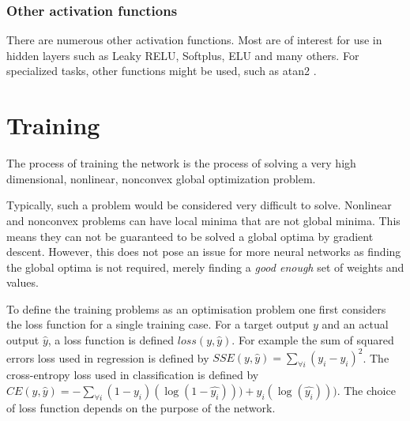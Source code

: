 \documentclass[12pt,parskip]{komatufte}
\begin{document}
\subsubsection{Other activation functions}

There are numerous other activation functions.
Most are of interest for use in hidden layers such as Leaky RELU, Softplus, ELU and many others.
For specialized tasks, other functions might be used, such as atan2 .




\section{Training}
The process of training the network is the process of solving a very high dimensional, nonlinear, nonconvex global optimization problem.


Typically, such a problem would be considered very difficult to solve.
Nonlinear and nonconvex problems can have local minima that are not global minima.
This means they can not be guaranteed to be solved  a global optima by gradient descent.
However, this does not pose an issue for more neural networks as finding the global optima is not required, merely finding a \emph{good enough} set of weights and values.

To define the training problems as an optimisation problem one first considers the loss function for a single training case.
For a target output $y$ and an actual output $\hat{y}$, a loss function is defined $loss(y, \hat{y})$.
For example the sum of squared errors loss used in regression is defined by 
$SSE(y, \hat{y})=\sum_{\forall i} (y_i-\hat{y_i})^2$.
The cross-entropy loss used in classification is defined by
$CE(y, \hat{y})=-\sum_{\forall i} (1-y_i)(\log (1-\hat{y_i}))) + y_i(\log (\hat{y_i})))$.
The choice of loss function depends on the purpose of the network.
\end{document}
